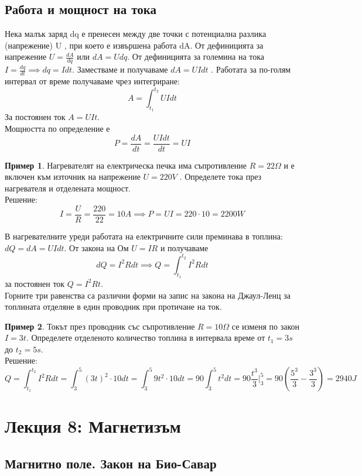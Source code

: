 \documentclass[fleqn, 12pt]{article}
\theoremstyle{definition}
\newtheorem{example}{Пример}[subsection]
\begin{document}
\subsection{Работа и мощност на тока}
Нека малък заряд dq е пренесен между две точки с потенциална разлика
(напрежение) U , при което е извършена работа dA. От дефиницията за
напрежение $U = \frac{dA}{dq}$ или $dA = Udq$. От дефиницията за големина на тока $I = \frac{dq}{dt} \implies dq = Idt$. Заместваме и получаваме $dA= U I dt$ . Работата за по-голям интервал от време
получаваме чрез интегриране:
$$A = \int_{t_1} ^{t_2} U I dt$$
За постоянен ток $A = UIt$. \\
Мощността по определение е
$$P = \frac{dA}{dt} = \frac{U I dt}{dt} = UI$$

\begin{example}
Нагревателят на електрическа печка има съпротивление $R = 22 \Omega$ и е
включен към източник на напрежение $U = 220 V$ . Определете тока през нагревателя
и отделената мощност.\\
Решение: 
$$I = \frac{U}{R} = \frac{220}{22} = 10A \implies P = UI = 220 \cdot 10 = 2200W$$
\end{example}

В нагревателните уреди работата на електричните сили преминава в топлина:
$dQ = dA = U I dt $. От закона на Ом $U = IR$ и получаваме
$$dQ = I^2 R dt \implies Q = \int_{t_1} ^{t_2} I^2 R dt$$
за постоянен ток $Q = I^2 R t$.\\
Горните три равенства са различни форми на запис на закона на Джаул-Ленц за
топлината отделяне в един проводник при протичане на ток.
 
\begin{example}
Токът през проводник със съпротивление $R = 10 \Omega$ се изменя по закон
$I = 3t$. Определете отделеното количество топлина в интервала време от $t_1 = 3s$  до
$t_2 = 5s$.\\
Решение: \\
$$Q = \int_{t_1} ^ {t_2} I^2 R dt =  \int_3 ^5 (3t)^2 \cdot 10 dt = \int_3 ^5 9t^2 \cdot 10 dt = 90 \int_3 ^5 t^2 dt = 90 \frac{t^3}{3} \Big| _3 ^ 5 = 90 \left( \frac{5^3}{3} - \frac{3^3}{3} \right) = 2940J$$

\end{example}


\newpage
\section{Лекция 8: Магнетизъм}

\subsection{Магнитно поле. Закон на Био-Савар}
\end{document}
